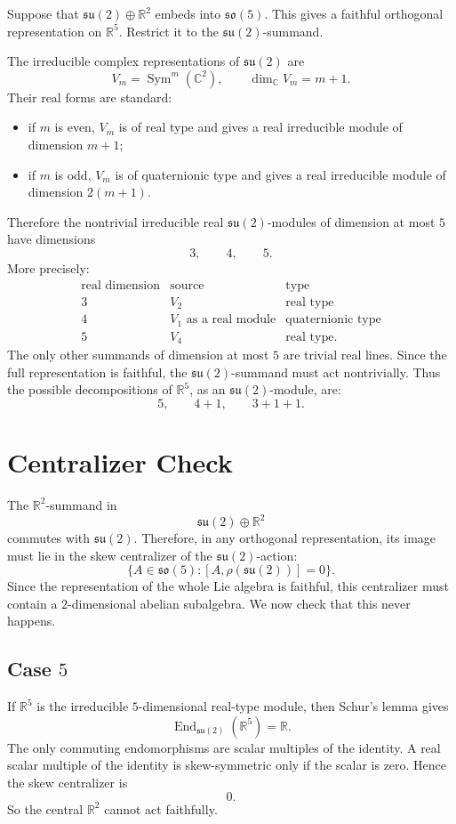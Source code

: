 \documentclass[11pt]{article}
\newcommand{\R}{\mathbb R}
\newcommand{\C}{\mathbb C}
\newcommand{\so}{\mathfrak{so}}
\newcommand{\su}{\mathfrak{su}}
\DeclareMathOperator{\End}{End}
\begin{document}
Suppose that \(\su(2)\oplus\R^2\) embeds into \(\so(5)\).  This gives a
faithful orthogonal representation on \(\R^5\).  Restrict it to the
\(\su(2)\)-summand.

The irreducible complex representations of \(\su(2)\) are
\[
  V_m=\operatorname{Sym}^m(\C^2),\qquad \dim_\C V_m=m+1.
\]
Their real forms are standard:
\begin{itemize}
\item if \(m\) is even, \(V_m\) is of real type and gives a real irreducible
module of dimension \(m+1\);
\item if \(m\) is odd, \(V_m\) is of quaternionic type and gives a real
irreducible module of dimension \(2(m+1)\).
\end{itemize}

Therefore the nontrivial irreducible real \(\su(2)\)-modules of dimension at
most \(5\) have dimensions
\[
  3,\qquad 4,\qquad 5.
\]
More precisely:
\[
\begin{array}{c|c|c}
\text{real dimension} & \text{source} & \text{type}\\ \hline
3 & V_2 & \text{real type}\\
4 & V_1 \text{ as a real module} & \text{quaternionic type}\\
5 & V_4 & \text{real type}.
\end{array}
\]
The only other summands of dimension at most \(5\) are trivial real lines.
Since the full representation is faithful, the \(\su(2)\)-summand must act
nontrivially.  Thus the possible decompositions of \(\R^5\), as an
\(\su(2)\)-module, are:
\[
  5,\qquad 4+1,\qquad 3+1+1.
\]

\section*{Centralizer Check}

The \(\R^2\)-summand in
\[
  \su(2)\oplus\R^2
\]
commutes with \(\su(2)\).  Therefore, in any orthogonal representation, its
image must lie in the skew centralizer of the \(\su(2)\)-action:
\[
  \{A\in\so(5): [A,\rho(\su(2))]=0\}.
\]
Since the representation of the whole Lie algebra is faithful, this
centralizer must contain a \(2\)-dimensional abelian subalgebra.  We now
check that this never happens.

\subsection*{Case \(5\)}

If \(\R^5\) is the irreducible \(5\)-dimensional real-type module, then
Schur's lemma gives
\[
  \End_{\su(2)}(\R^5)=\R.
\]
The only commuting endomorphisms are scalar multiples of the identity.  A
real scalar multiple of the identity is skew-symmetric only if the scalar is
zero.  Hence the skew centralizer is
\[
  0.
\]
So the central \(\R^2\) cannot act faithfully.
\end{document}
